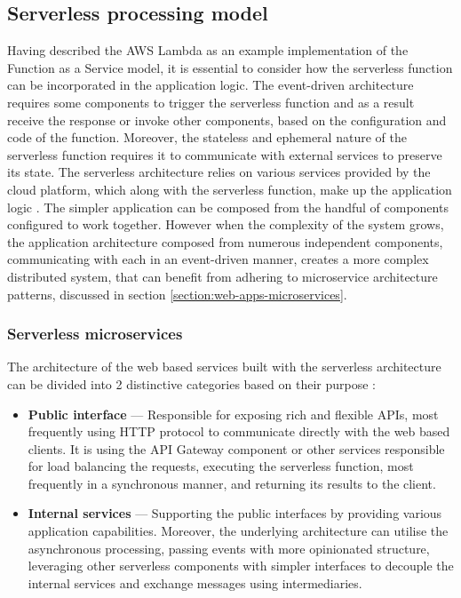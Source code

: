 \subsection{Serverless processing model}

Having described the AWS Lambda as an example implementation of the Function as a Service model, it is essential to consider how the serverless function can be incorporated in the application logic.
The event-driven architecture requires some components to trigger the serverless function and as a result receive the response or invoke other components, based on the configuration and code of the function.
Moreover, the stateless and ephemeral nature of the serverless function requires it to communicate with external services to preserve its state.
The serverless architecture relies on various services provided by the cloud platform, which along with the serverless function, make up the application logic \cite{EvaluationOfServerlessApplicationProgrammingModel}.
The simpler application can be composed from the handful of components configured to work together. 
However when the complexity of the system grows, the application architecture composed from numerous independent components, communicating with each in an event-driven manner, creates a more complex distributed system, that can benefit from adhering to microservice architecture patterns, discussed in section \ref{section:web-apps-microservices}.

\subsubsection{Serverless microservices}

The architecture of the web based services built with the serverless architecture can be divided into 2 distinctive categories based on their purpose \cite{AWSReinventBuildingMicroservicesWithAWSLambda}:

\begin{itemize}
   \item \textbf{Public interface} --- Responsible for exposing rich and flexible APIs, most frequently using HTTP protocol to communicate directly with the web based clients. It is using the API Gateway component or other services responsible for load balancing the requests, executing the serverless function, most frequently in a synchronous manner, and returning its results to the client.
   \item \textbf{Internal services} --- Supporting the public interfaces by providing various application capabilities. Moreover, the underlying architecture can utilise the asynchronous processing, passing events with more opinionated structure, leveraging other serverless components with simpler interfaces to decouple the internal services and exchange messages using intermediaries.
\end{itemize}

